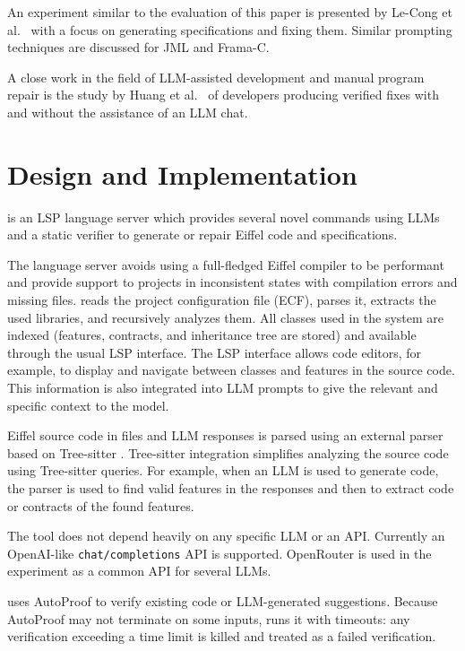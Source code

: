 \documentclass[runningheads]{llncs}
\begin{document}
An experiment similar to the evaluation of this paper is presented by Le-Cong et al.~\cite{le2025can}
with a focus
on generating specifications and fixing them. Similar prompting techniques are
discussed for JML and Frama-C.

A close work in the field of LLM-assisted development and manual program repair is
the study by Huang et al.~\cite{huang2025aimodelshelpproduce} of developers producing verified fixes with and without
the assistance of an LLM chat.

\section{Design and Implementation}\label{design-and-implementation}

\toolname{} is an LSP language server which provides several novel
commands using LLMs and a static verifier to generate or repair Eiffel code and
specifications.

The language server avoids using a full-fledged Eiffel compiler to be performant and provide support to projects in inconsistent states with compilation errors and missing files.
\toolname{} reads the project configuration file (ECF),
parses it, extracts the used libraries, and recursively analyzes them.
All classes used in the system are indexed (features, contracts, and inheritance tree are stored)
and available through the usual
LSP interface. The LSP interface allows code editors, for example, to display and navigate
between classes and features in the source code. This information is also
integrated into LLM prompts to give the relevant and specific context to the model.

Eiffel source code in files and LLM responses is parsed using an external
parser \cite{tree-sitter-eiffel} based on Tree-sitter \cite{treesitter}.
Tree-sitter integration simplifies analyzing the source code using
Tree-sitter queries. For example, when an LLM is used to generate code,
the parser is used to find valid features in the responses and
then to extract code or contracts of the found features.

The tool does not depend heavily on any specific LLM or an API.
Currently an OpenAI-like \texttt{chat/completions} API is supported.
OpenRouter is used in the experiment as a common API for several LLMs.

\toolname{} uses AutoProof to verify existing code or LLM-generated suggestions.
Because AutoProof may not terminate on some inputs, \toolname{} runs it with timeouts: any verification exceeding a time limit is killed and treated as a failed verification.
\end{document}
